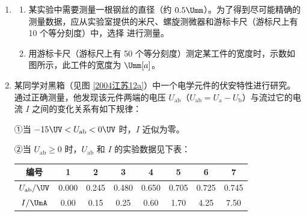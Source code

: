 \documentclass[\gkver]{gaokaozhenti}
\begin{document}
\begin{enumerate}
{	
}

\item
\begin{enumerate}
	\item
	某实验中需要测量一根钢丝的直径（约 $0.5\Umm$）。为了得到尽可能精确的测量数据，应从实验室提供的米尺、螺旋测微器和游标卡尺（游标尺上有 10 个等分刻度）中，选择  进行测量。

	\item
	用游标卡尺（游标尺上有 50 个等分刻度）测定某工件的宽度时，示数如图所示，此工件的宽度为  $\Umm[a]$。
\end{enumerate}


\item
某同学对黑箱（见图 \ref{2004江苏12a}）中一个电学元件的伏安特性进行研究。通过正确测量，他发现该元件两端的电压 $U_{\text{ab}}$（$U_{\text{ab}}=U_{\text{a}}-U_{\text{b}}$）与流过它的电流 $I$ 之间的变化关系有如下规律：

①当 $-15\UV<U_{\text{ab}}<0\UV$ 时，$I$ 近似为零。

②当 $U_{\text{ab}}\geqslant 0$ 时，$U_{\text{ab}}$ 和 $I$ 的实验数据见下表：

\begin{center}
\begin{tabular}{|c|c|c|c|c|c|c|c|}
\hline
编号 & 1 & 2 & 3 & 4 & 5 & 6 & 7 \\
\hline
$U_{\text{ab}}/\UV$ & 0.000 & 0.245 & 0.480 & 0.650 & 0.705 & 0.725 & 0.745 \\
\hline
$I/\UmA$ & 0.00 & 0.15 & 0.25 & 0.60 & 1.70 & 4.25 & 7.50 \\
\hline
\end{tabular}
\end{center}


\end{enumerate}
\end{document}
